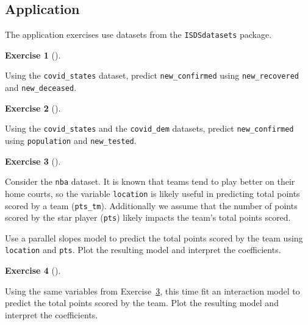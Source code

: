 \documentclass[
  letterpaper,
  DIV=11,
  numbers=noendperiod]{scrreprt}
\theoremstyle{definition}
\newtheorem{exercise}{Exercise}[chapter]
\theoremstyle{remark}
\begin{document}
\hypertarget{sec-ex06-application}{%
\subsection{Application}\label{sec-ex06-application}}

The application exercises use datasets from the \texttt{ISDSdatasets}
package.

\begin{exercise}[]\protect\hypertarget{exr-ch06-app1}{}\label{exr-ch06-app1}

Using the \texttt{covid\_states} dataset, predict
\texttt{new\_confirmed} using \texttt{new\_recovered} and
\texttt{new\_deceased}.

\end{exercise}

\begin{exercise}[]\protect\hypertarget{exr-ch06-app2}{}\label{exr-ch06-app2}

Using the \texttt{covid\_states} and the \texttt{covid\_dem} datasets,
predict \texttt{new\_confirmed} using \texttt{population} and
\texttt{new\_tested}.

\end{exercise}

\begin{exercise}[]\protect\hypertarget{exr-ch06-app3}{}\label{exr-ch06-app3}

Consider the \texttt{nba} dataset. It is known that teams tend to play
better on their home courts, so the variable \texttt{location} is likely
useful in predicting total points scored by a team (\texttt{pts\_tm}).
Additionally we assume that the number of points scored by the star
player (\texttt{pts}) likely impacts the team's total points scored.

Use a parallel slopes model to predict the total points scored by the
team using \texttt{location} and \texttt{pts}. Plot the resulting model
and interpret the coefficients.

\end{exercise}

\begin{exercise}[]\protect\hypertarget{exr-ch06-app4}{}\label{exr-ch06-app4}

Using the same variables from Exercise~\ref{exr-ch06-app3}, this time
fit an interaction model to predict the total points scored by the team.
Plot the resulting model and interpret the coefficients.

\end{exercise}
\end{document}
